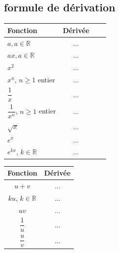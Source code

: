     \subsection{formule de dérivation}
    
    \begin{minipage}[c]{0.48\linewidth}
    	\begin{center}
    		\renewcommand{\arraystretch}{2}
    		\begin{tabular}{|Xc|Xc|}
    			\hline Fonction & Dérivée \\
    			\hline $a, a \in \mathbb{R}$ & $\ldots$ \\
    			\hline $a x, a \in \mathbb{R}$ & $\ldots$ \\
    			\hline $x^2$ & $\ldots$ \\
    			\hline $x^n$, $n \geqslant 1$ entier & $\ldots$ \\
    			\hline $\dfrac{1}{x}$ & $\ldots$ \\
    			\hline $\dfrac{1}{x^n}$, $n \geqslant 1$ entier & $\ldots$ \\
    			\hline $\sqrt{x}$ & $\ldots$ \\
    			\hline $e^x$ & $\ldots$ \\
    			\hline $e^{k x}$, $k \in \mathbb{R}$ & $\ldots$ \\
    			\hline
    		\end{tabular}
    	\end{center}
    	
    \end{minipage} \hfill
    \begin{minipage}[c]{0.48\linewidth}
    	\begin{center}
    		\renewcommand{\arraystretch}{2.5}
    		\begin{tabular}{|c|c|}
    			\hline Fonction & Dérivée \\
    			\hline$u+v$ & $\ldots$ \\
    			\hline$k u$, $k \in \mathbb{R}$ & $\ldots$ \\
    			\hline$u v$ & $\ldots$ \\
    			\hline$\dfrac{1}{u}$ & $\ldots$ \\
    			\hline$\dfrac{u}{v}$ & $\ldots$ \\
    			\hline
    		\end{tabular}
    	\end{center}
    \end{minipage}
    
